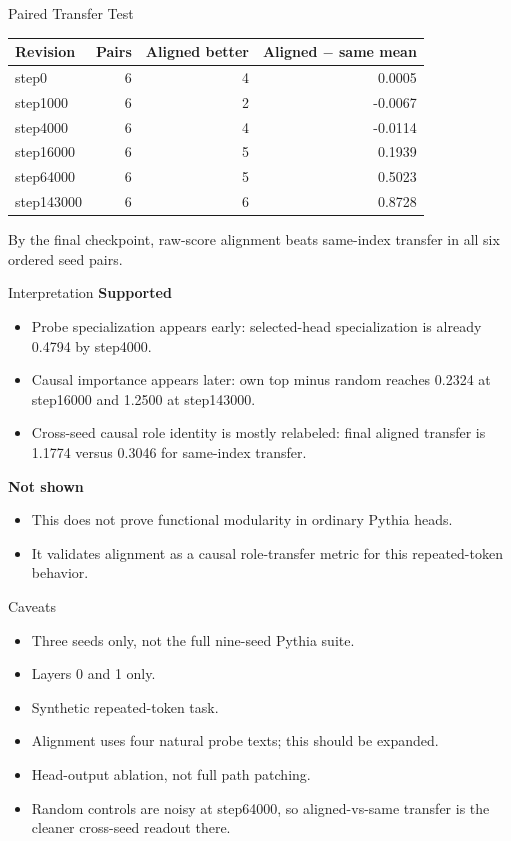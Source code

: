 \documentclass[aspectratio=169]{beamer}
\begin{document}
\begin{frame}{Paired Transfer Test}
  \small
  \begin{center}
  \begin{tabular}{lrrr}
    \toprule
    Revision & Pairs & Aligned better & Aligned $-$ same mean \\
    \midrule
    step0 & 6 & 4 & 0.0005 \\
    step1000 & 6 & 2 & -0.0067 \\
    step4000 & 6 & 4 & -0.0114 \\
    step16000 & 6 & 5 & 0.1939 \\
    step64000 & 6 & 5 & 0.5023 \\
    step143000 & 6 & 6 & 0.8728 \\
    \bottomrule
  \end{tabular}
  \end{center}

  \vspace{0.8em}
  By the final checkpoint, raw-score alignment beats same-index transfer in all
  six ordered seed pairs.
\end{frame}

\begin{frame}{Interpretation}
  \textbf{Supported}
  \begin{itemize}
    \item Probe specialization appears early: selected-head specialization is
    already 0.4794 by step4000.
    \item Causal importance appears later: own top minus random reaches 0.2324
    at step16000 and 1.2500 at step143000.
    \item Cross-seed causal role identity is mostly relabeled: final aligned
    transfer is 1.1774 versus 0.3046 for same-index transfer.
  \end{itemize}

  \vspace{0.6em}
  \textbf{Not shown}
  \begin{itemize}
    \item This does not prove functional modularity in ordinary Pythia heads.
    \item It validates alignment as a causal role-transfer metric for this
    repeated-token behavior.
  \end{itemize}
\end{frame}

\begin{frame}{Caveats}
  \begin{itemize}
    \item Three seeds only, not the full nine-seed Pythia suite.
    \item Layers 0 and 1 only.
    \item Synthetic repeated-token task.
    \item Alignment uses four natural probe texts; this should be expanded.
    \item Head-output ablation, not full path patching.
    \item Random controls are noisy at step64000, so aligned-vs-same transfer is
    the cleaner cross-seed readout there.
  \end{itemize}
\end{frame}
\end{document}
